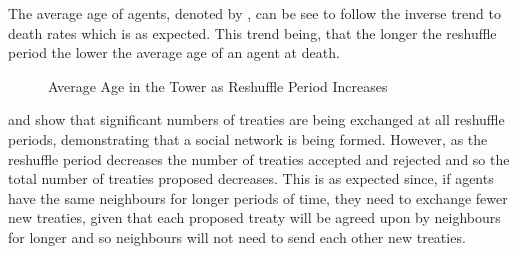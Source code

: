 The average age of agents, denoted by , can be see to follow the inverse trend to death rates which is as expected. This trend being, that the longer the reshuffle period the lower the average age of an agent at death. 
\begin{figure}[H] %
    \centering
    \begin{minipage}{0.8\textwidth}
    \end{minipage}
    \caption{Average Age in the Tower as Reshuffle Period Increases}
    \label{fig:Average-Age-as-Shuffle-Period-Decreases}
\end{figure}

 and  show that significant numbers of treaties are being exchanged at all reshuffle periods, demonstrating that a social network is being formed. However, as the reshuffle period decreases the number of treaties accepted and rejected and so the total number of treaties proposed decreases. This is as expected since, if agents have the same neighbours for longer periods of time, they need to exchange fewer new treaties, given that each proposed treaty will be agreed upon by neighbours for longer and so neighbours will not need to send each other new treaties. 

